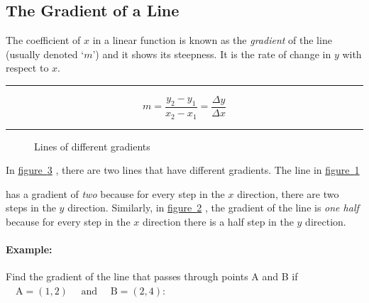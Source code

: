 \documentclass[a5paper,9pt]{book}
\theoremstyle{definition}
\newcommand{\txtlinesur}[1]{%
    \vspace*{\baselineskip}

    \hrule%

    \vspace*{\medskipamount}

    #1

    \vspace*{\medskipamount}

    \hrule%

    \vspace*{\baselineskip}
}
\newcommand{\fig}[2]{%
    \hyperref[#2]{#1~\ref*{#2}}%
}
\begin{document}
        \subsection{The Gradient of a Line}

        The coefficient of $x$ in a linear function is known as the \emph{gradient}
        of the line (usually denoted `$m$') and it shows its steepness. It is the rate
        of change in $y$ with respect to $x$.

        \txtlinesur{%
            \begin{equation}
                m = \frac{y_2-y_1}{x_2-x_1} = \frac{\Delta y}{\Delta x}
                \label{eq:straight_line_gradient}
            \end{equation}
        }

        \pagebreak

        \begin{figure}[ht]
            \centering
                \begin{subfigure}{0.45\textwidth}
                    \centering
                    
                    \caption{}\label{fig:lines_of_different_gradients_a}
                \end{subfigure}
                \hspace{20pt}
                \begin{subfigure}{0.45\textwidth}
                    \centering
                    
                    \caption{}\label{fig:lines_of_different_gradients_b}
                \end{subfigure}
            \caption{Lines of different gradients}\label{fig:lines_of_different_gradients}
        \end{figure}

        In \fig{figure}{fig:lines_of_different_gradients}, there are two lines that have
        different gradients. The line in \fig{figure}{fig:lines_of_different_gradients_a}
        has a gradient of \emph{two} because for every step in the $x$ direction, there are two
        steps in the $y$ direction. Similarly, in \fig{figure}{fig:lines_of_different_gradients_b},
        the gradient of the line is \emph{one half} because for every step in the $x$ direction
        there is a half step in the $y$ direction.

        \paragraph{Example:} Find the gradient of the line that passes through points
        A and B if $\quad\mathrm{A} = (1,2)\quad\text{ and }\quad\mathrm{B} = (2,4)$:
\end{document}
